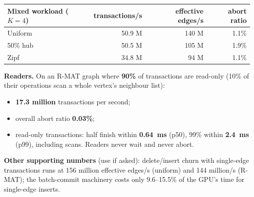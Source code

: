 \documentclass[11pt,a4paper]{article}
\begin{document}
\begin{center}
\begin{tabular}{@{}lrrr@{}}
\toprule
Mixed workload ($K=4$) & transactions/s & effective edges/s & abort ratio \\
\midrule
Uniform & 50.9 M & 140 M & 1.1\% \\
50\% hub & 50.5 M & 105 M & 1.9\% \\
Zipf & 34.8 M & 94 M & 1.1\% \\
\bottomrule
\end{tabular}
\end{center}

\textbf{Readers.} On an R-MAT graph where \textbf{90\%} of transactions are read-only (10\% of their operations scan a
whole vertex's neighbour list):
\begin{itemize}
\item \textbf{17.3 million} transactions per second;
\item overall abort ratio \textbf{0.03\%};
\item read-only transactions: half finish within \textbf{0.64~ms} (p50), 99\% within \textbf{2.4~ms} (p99), including
  scans. Readers never wait and never abort.
\end{itemize}

\textbf{Other supporting numbers} (use if asked): delete/insert churn with single-edge transactions runs at 156 million
effective edges/s (uniform) and 144 million/s (R-MAT); the batch-commit machinery costs only 9.6--15.5\% of the GPU's
time for single-edge inserts.
\end{document}
